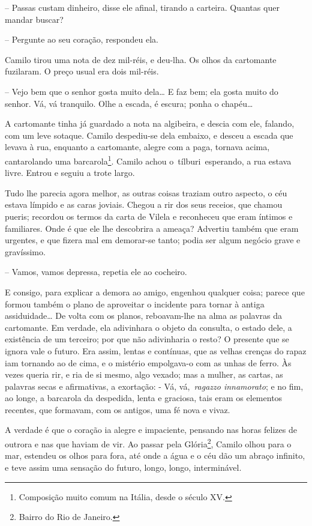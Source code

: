 -- Passas custam dinheiro, disse ele afinal, tirando a carteira. Quantas
quer mandar buscar?

-- Pergunte ao seu coração, respondeu ela.

Camilo tirou uma nota de dez mil-réis, e deu-lha. Os olhos da cartomante
fuzilaram. O preço usual era dois mil-réis.

-- Vejo bem que o senhor gosta muito dela\ldots{} E faz bem; ela gosta
muito do senhor. Vá, vá tranquilo. Olhe a escada, é escura; ponha o
chapéu\ldots{}

A cartomante tinha já guardado a nota na algibeira, e descia com ele,
falando, com um leve sotaque. Camilo despediu-se dela embaixo, e desceu
a escada que levava à rua, enquanto a cartomante, alegre com a paga,
tornava acima, cantarolando uma barcarola\footnote{Composição muito
  comum na Itália, desde o século XV.}. Camilo achou
o~tílburi~esperando, a rua estava livre. Entrou e seguiu a trote largo.

Tudo lhe parecia agora melhor, as outras coisas traziam outro aspecto, o
céu estava límpido e as caras joviais. Chegou a rir dos seus receios,
que chamou pueris; recordou os termos da carta de Vilela e reconheceu
que eram íntimos e familiares. Onde é que ele lhe descobrira a ameaça?
Advertiu também que eram urgentes, e que fizera mal em demorar-se tanto;
podia ser algum negócio grave e gravíssimo.

-- Vamos, vamos depressa, repetia ele ao cocheiro.

E consigo, para explicar a demora ao amigo, engenhou qualquer coisa;
parece que formou também o plano de aproveitar o incidente para tornar à
antiga assiduidade\ldots{} De volta com os planos, reboavam-lhe na alma
as palavras da cartomante. Em verdade, ela adivinhara o objeto da
consulta, o estado dele, a existência de um terceiro; por que não
adivinharia o resto? O presente que se ignora vale o futuro. Era assim,
lentas e contínuas, que as velhas crenças do rapaz iam tornando ao de
cima, e o mistério empolgava-o com as unhas de ferro. Às vezes queria
rir, e ria de si mesmo, algo vexado; mas a mulher, as cartas, as
palavras secas e afirmativas, a exortação: - Vá, vá,~\emph{ragazzo
innamorato}; e no fim, ao longe, a barcarola da despedida, lenta e
graciosa, tais eram os elementos recentes, que formavam, com os antigos,
uma fé nova e vivaz.

A verdade é que o coração ia alegre e impaciente, pensando nas horas
felizes de outrora e nas que haviam de vir. Ao passar pela
Glória\footnote{Bairro do Rio de Janeiro.}, Camilo olhou para o mar,
estendeu os olhos para fora, até onde a água e o céu dão um abraço
infinito, e teve assim uma sensação do futuro, longo, longo,
interminável.

